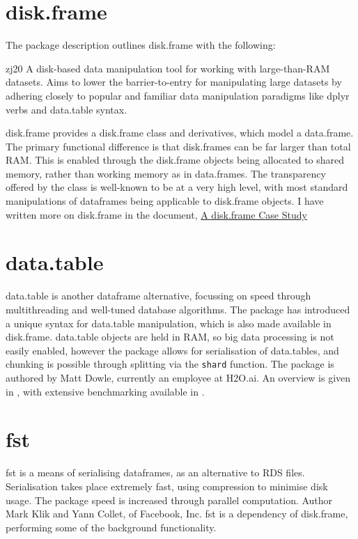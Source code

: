 \documentclass[10pt,a4paper]{article}
\begin{document}
\section{disk.frame}
\label{sec:disk.frame}

The package description outlines disk.frame with the following:

\begin{displaycquote}{zj20}
  A disk-based data manipulation tool for working with large-than-RAM
  datasets. Aims to lower the barrier-to-entry for manipulating large
  datasets by adhering closely to popular and familiar data
  manipulation paradigms like dplyr verbs and data.table syntax.
\end{displaycquote}

disk.frame provides a disk.frame class and derivatives, which model a
data.frame. The primary functional difference is that disk.frames can
be far larger than total RAM. This is enabled through the disk.frame
objects being allocated to shared memory, rather than working memory
as in data.frames. The transparency offered by the class is well-known
to be at a very high level, with most standard manipulations of
dataframes being applicable to disk.frame objects. I have written more
on disk.frame in the document, \href{case-study-disk.frame.pdf}{A
  disk.frame Case Study}

\section{data.table}
\label{sec:data.table}

data.table is another dataframe alternative, focussing on speed
through multithreading and well-tuned database
algorithms\cite{dowle19}. The package has introduced a unique syntax
for data.table manipulation, which is also made available in
disk.frame. data.table objects are held in RAM, so big data processing
is not easily enabled, however the package allows for serialisation of
data.tables, and chunking is possible through splitting via the
\texttt{shard} function. The package is authored by Matt Dowle,
currently an employee at H2O.ai. An overview is given in
\textcite{dowle19:_introd}, with extensive benchmarking available in
\textcite{dowle19:_bench}.

\section{fst}
\label{sec:fst}

fst is a means of serialising dataframes, as an alternative to RDS
files\cite{klik19}. Serialisation takes place extremely fast, using compression to
minimise disk usage. The package speed is increased through parallel
computation. Author Mark Klik and Yann Collet, of Facebook, Inc. fst
is a dependency of disk.frame, performing some of the background
functionality.
\end{document}
